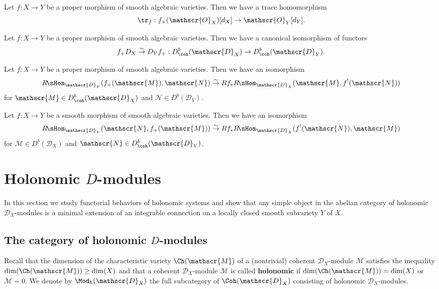 \begin{proposition}\label{D-module proper morphism trace map}
Let $f:X\to Y$ be a proper morphism of smooth algebraic varieties. Then we have a trace homomorphism
\[\tr_f:f_+(\mathscr{O}_X)[d_X]\to \mathscr{O}_Y[d_Y].\]
\end{proposition}

\begin{theorem}\label{D-module proper morphism duality functor and direct image commute}
Let $f:X\to Y$ be a proper morphism of smooth algebraic varieties. Then we have a canonical isomorphism of functors
\[f_+D_X\stackrel{\sim}{\to} D_Yf_+:D^b_{\coh}(\mathscr{D}_X)\to D_{\coh}^b(\mathscr{D}_Y).\]
\end{theorem}

\begin{corollary}\label{D-module proper morphism adjunction formula}
Let $f:X\to Y$ be a proper morphism of smooth algebraic varieties. Then we have an isomorphism
\[R\!\sHom_{\mathscr{D}_Y}(f_+(\mathscr{M}),\mathscr{N})\stackrel{\sim}{\to} Rf_*R\!\sHom_{\mathscr{D}_X}(\mathscr{M},f^!(\mathscr{N}))\]
for $\mathscr{M}\in D^b_{\coh}(\mathscr{D}_X)$ and $\mathscr{N}\in D^b(\mathscr{D}_Y)$.
\end{corollary}

\begin{theorem}
Let $f:X\to Y$ be a smooth morphism of smooth algebraic varieties. Then we have an isomorphism
\[R\!\sHom_{\mathscr{D}_Y}(\mathscr{N},f_+(\mathscr{M}))\stackrel{\sim}{\to} Rf_*R\!\sHom_{\mathscr{D}_X}(f^!(\mathscr{N}),\mathscr{M})\]
for $\mathscr{M}\in D^b(\mathscr{D}_X)$ and $\mathscr{N}\in D^b_{\coh}(\mathscr{D}_Y)$.
\end{theorem}

\section{Holonomic \texorpdfstring{$D$}{D}-modules}
In this section we study functorial behaviors of holonomic systems and show that any simple object in the abelian category of holonomic $\mathscr{D}_X$-modules is a minimal extension of an integrable connection on a locally closed smooth subvariety $Y$ of $X$.

\subsection{The category of holonomic \texorpdfstring{$D$}{D}-modules}
Recall that the dimension of the characteristic variety $\Ch(\mathscr{M})$ of a (nontrivial) coherent $\mathscr{D}_X$-module $\mathscr{M}$ satisfies the inequality $\dim(\Ch(\mathscr{M}))\geq\dim(X)$ and that a coherent $\mathscr{D}_X$-module $\mathscr{M}$ is called \textbf{holonomic} if $\dim(\Ch(\mathscr{M}))=\dim(X)$ or $\mathscr{M}=0$. We denote by $\Mod_h(\mathscr{D}_X)$ the full subcategory of $\Coh(\mathscr{D}_X)$ consisting of holonomic $\mathscr{D}_X$-modules.

